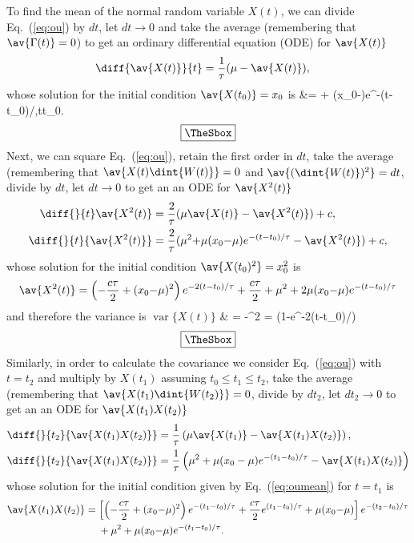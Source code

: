 \documentclass[10pt,a4paper]{article}
\newcommand{\eq}[1]{Eq.~(\ref{#1})}
\newcommand{\var}[1]{\ensuremath{\mathop{\mathrm{var}}\{#1\}}}
\newcommand{\ODE}{\renewcommand{\ODE}{ODE\xspace}ordinary differential equation (ODE)\xspace}
\newlength{\mylength}
\newenvironment{falign}%
{\setlength{\fboxsep}{5pt}
\setlength{\fboxrule}{0.5pt}
\setlength{\mylength}{\textwidth}
\addtolength{\mylength}{-2\fboxsep}
\addtolength{\mylength}{-2\fboxrule}
\Sbox
\minipage{\mylength}%
	\setlength{\abovedisplayskip}{-2\lineskip}
	\setlength{\belowdisplayskip}{-2\lineskip}
\align}%
{\endalign\endminipage\endSbox
\[\fbox{\TheSbox}\]}
\begin{document}
To find the mean of the normal random variable $X(t)$, we can divide
\eq{eq:ou} by $dt$, let $dt\rightarrow0$ and take the average (remembering
that $\av{\Gamma(t)}=0$) to get an \ODE for $\av{X(t)}$ 
\begin{align}
\diff{\av{X(t)}}{t}&=\frac{1}{\tau}(\mu-\av{X(t)}), 
\end{align}
whose solution for the initial condition $\av{X(t_0)}=x_0$ is
\begin{falign}
&= \mu + (x_0{-}\mu)e^{-(t-t_0)/\tau},\quad{}\quad t\geq t_0.
\label{eq:oumeaneq}
\end{falign}
Next, we can square \eq{eq:ou}, retain the first order in $dt$, 
take the average (remembering that $\av{X(t)\dint{W(t)}}=0$ and 
$\av{(\dint{W(t)})^2}=dt$, divide by $dt$, let $dt\rightarrow0$ to get an 
an \ODE for $\av{X^2(t)}$
\begin{align}
\diff{}{t}\av{X^2(t)}&=\frac{2}{\tau}(\mu\av{X(t)}-\av{X^2(t)})+c,\\
\diff{}{t}{\av{X^2(t)}}&=\frac{2}{\tau}(\mu^2{+}\mu(x_0{-}\mu)e^{-(t-t_0)/\tau}
-\av{X^2(t)})+c,
\end{align}
whose solution for the initial condition $\av{X(t_0)^2}=x_0^2$ is
\begin{align}
\av{X^2(t)} = \left(-\frac{c\tau}{2}+(x_0{-}\mu)^2\right)e^{-2(t-t_0)/\tau}
+\frac{c\tau}{2}+\mu^2+2\mu(x_0{-}\mu)e^{-(t-t_0)/\tau}
\label{eq:oumean}
\end{align}
and therefore the variance is 
\begin{falign}
\var{X(t)} & = -^2 = 
\left(1-e^{-2(t-t_0)/\tau}\right)
\label{eq:ouvar}
\end{falign}
Similarly, in order to calculate the covariance we consider \eq{eq:ou} with
$t{=}t_2$ and multiply by $X(t_1)$ assuming $t_0\leq t_1\leq t_2$, take the
average (remembering that $\av{X(t_1)\dint{W(t_2)}}=0$, divide by $dt_2$, let
$dt_2\rightarrow0$ to get an an \ODE for $\av{X(t_1)X(t_2)}$
\begin{align}
\diff{}{t_2}{\av{X(t_1)X(t_2)}} &=  \frac{1}{\tau}
\left(\mu\av{X(t_1)}-\av{X(t_1)X(t_2)}\right),\\
\diff{}{t_2}{\av{X(t_1)X(t_2)}} &=  \frac{1}{\tau}
\left(\mu^2+\mu(x_0-\mu)e^{-(t_1-t_0)/\tau}-\av{X(t_1)X(t_2)}\right)
\end{align}
whose solution for the initial condition given by \eq{eq:oumean} for $t=t_1$ is 
\begin{align}
\begin{split}
\av{X(t_1)X(t_2)} &= \left[
\left(-\frac{c\tau}{2}+(x_0{-}\mu)^2\right)e^{-(t_1-t_0)/\tau}+
\frac{c\tau}{2}e^{(t_1-t_0)/\tau}+\mu(x_0{-}\mu)\right]e^{-(t_2-t_0)/\tau}\\
&\quad\; + \mu^2+\mu(x_0{-}\mu)e^{-(t_1-t_0)/\tau}.
\end{split}
\end{align}
\end{document}
